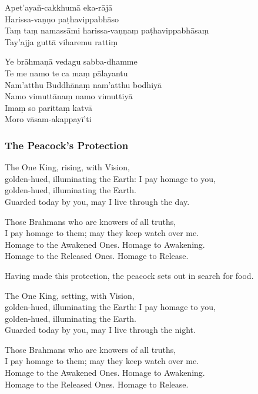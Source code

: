 
\vspace*{-.2\baselineskip}

Apet'ayañ-cakkhumā eka-rājā\\
Harissa-vaṇṇo paṭhavippabhāso\\
Taṃ taṃ namassāmi harissa-vaṇṇaṃ paṭhavippabhāsaṃ\\
Tay'ajja guttā viharemu rattiṃ

Ye brāhmaṇā vedagu sabba-dhamme\\
Te me namo te ca maṃ pālayantu\\
Nam'atthu Buddhānaṃ nam'atthu bodhiyā\\
Namo vimuttānaṃ namo vimuttiyā\\
Imaṃ so parittaṃ katvā\\
Moro vāsam-akappayī'ti 

\subsubsection{The Peacock's Protection}

The One King, rising, with Vision,\\
golden-hued, illuminating the Earth: I pay homage to you,\\
golden-hued, illuminating the Earth.\\
Guarded today by you, may I live through the day.

Those Brahmans who are knowers of all truths,\\
I pay homage to them; may they keep watch over me.\\
Homage to the Awakened Ones. Homage to Awakening.\\
Homage to the Released Ones. Homage to Release.

Having made this protection, the peacock sets out in search for food.

The One King, setting, with Vision,\\
golden-hued, illuminating the Earth: I pay homage to you,\\
golden-hued, illuminating the Earth.\\
Guarded today by you, may I live through the night.

Those Brahmans who are knowers of all truths,\\
I pay homage to them; may they keep watch over me.\\
Homage to the Awakened Ones. Homage to Awakening.\\
Homage to the Released Ones. Homage to Release.

